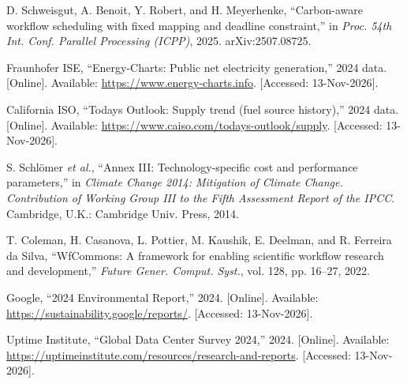 \documentclass[12pt,a4paper,oneside,openany]{report}
\begin{document}
\begin{enumerate}[label={[\arabic*]}, leftmargin=2.6em, labelsep=0.6em, itemsep=4pt]
\item D. Schweisgut, A. Benoit, Y. Robert, and H. Meyerhenke, ``Carbon-aware workflow scheduling with fixed mapping and deadline constraint,'' in \emph{Proc. 54th Int. Conf. Parallel Processing (ICPP)}, 2025. arXiv:2507.08725.
\item Fraunhofer ISE, ``Energy-Charts: Public net electricity generation,'' 2024 data. {[}Online{]}. Available: \url{https://www.energy-charts.info}. {[}Accessed: 13-Nov-2026{]}.
\item California ISO, ``Today\textquotesingle s Outlook: Supply trend (fuel source history),'' 2024 data. {[}Online{]}. Available: \url{https://www.caiso.com/todays-outlook/supply}. {[}Accessed: 13-Nov-2026{]}.
\item S. Schlömer \emph{et al.}, ``Annex III: Technology-specific cost and performance parameters,'' in \emph{Climate Change 2014: Mitigation of Climate Change. Contribution of Working Group III to the Fifth Assessment Report of the IPCC}. Cambridge, U.K.: Cambridge Univ. Press, 2014.
\item T. Coleman, H. Casanova, L. Pottier, M. Kaushik, E. Deelman, and R. Ferreira da Silva, ``WfCommons: A framework for enabling scientific workflow research and development,'' \emph{Future Gener. Comput. Syst.}, vol. 128, pp. 16--27, 2022.
\item Google, ``2024 Environmental Report,'' 2024. {[}Online{]}. Available: \url{https://sustainability.google/reports/}. {[}Accessed: 13-Nov-2026{]}.
\item Uptime Institute, ``Global Data Center Survey 2024,'' 2024. {[}Online{]}. Available: \url{https://uptimeinstitute.com/resources/research-and-reports}. {[}Accessed: 13-Nov-2026{]}.
\end{enumerate}
\end{document}
